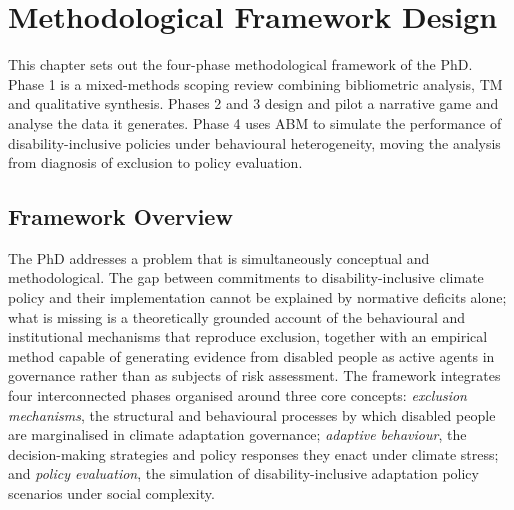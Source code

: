 \documentclass[12pt,a4paper]{report}
\begin{document}
\clearpage

\chapter{Methodological Framework Design}
\vspace*{-1cm}

This chapter sets out the four-phase methodological framework of the PhD. Phase 1 is a mixed-methods scoping review combining bibliometric analysis, TM and qualitative synthesis. Phases 2 and 3 design and pilot a narrative game and analyse the data it generates. Phase 4 uses ABM to simulate the performance of disability-inclusive policies under behavioural heterogeneity, moving the analysis from diagnosis of exclusion to policy evaluation.
\clearpage

\section{Framework Overview}
The PhD addresses a problem that is simultaneously conceptual and methodological. The gap between commitments to disability-inclusive climate policy and their implementation cannot be explained by normative deficits alone; what is missing is a theoretically grounded account of the behavioural and institutional mechanisms that reproduce exclusion, together with an empirical method capable of generating evidence from disabled people as active agents in governance rather than as subjects of risk assessment. The framework integrates four interconnected phases organised around three core concepts: \textit{exclusion mechanisms}, the structural and behavioural processes by which disabled people are marginalised in climate adaptation governance; \textit{adaptive behaviour}, the decision-making strategies and policy responses they enact under climate stress; and \textit{policy evaluation}, the simulation of disability-inclusive adaptation policy scenarios under social complexity.
\end{document}
